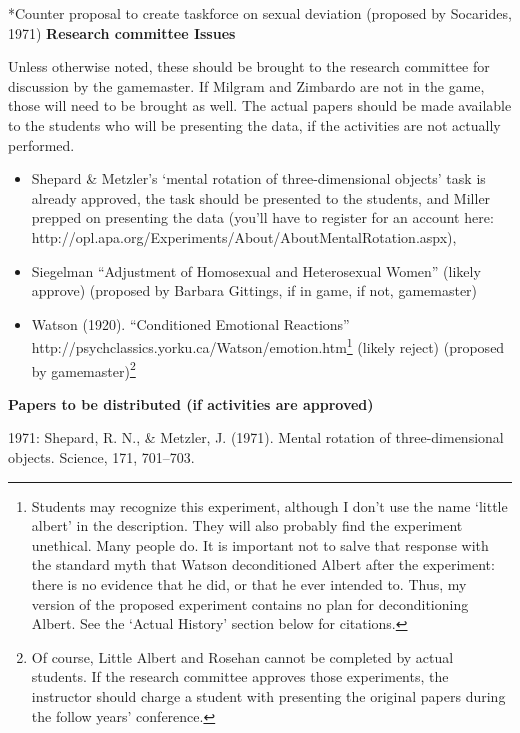 *Counter proposal to create taskforce on sexual deviation (proposed by Socarides, 1971)
 \textbf{Research committee Issues}

Unless otherwise noted, these should be brought to the research committee for discussion by the gamemaster. If Milgram and Zimbardo are not in the game, those will need to be brought as well. The actual papers should be made available to the students who will be presenting the data, if the activities are not actually performed.

\begin{itemize}
\item Shepard \& Metzler's `mental rotation of three-dimensional objects' task is already approved, the task should be presented to the students, and Miller prepped on presenting the data (you'll have to register for an account here: http:\slash \slash opl.apa.org\slash Experiments\slash About\slash AboutMentalRotation.aspx), 

\item Siegelman ``Adjustment of Homosexual and Heterosexual Women'' (likely approve) (proposed by Barbara Gittings, if in game, if not, gamemaster)

\item Watson (1920). ``Conditioned Emotional Reactions'' http:\slash \slash psychclassics.yorku.ca\slash Watson\slash emotion.htm\footnote{Students may recognize this experiment, although I don't use the name `little albert' in the description. They will also probably find the experiment unethical. Many people do. It is important not to salve that response with the standard myth that Watson deconditioned Albert after the experiment: there is no evidence that he did, or that he ever intended to. Thus, my version of the proposed experiment contains no plan for deconditioning Albert. See the `Actual History' section below for citations.} (likely reject) (proposed by gamemaster)\footnote{Of course, Little Albert and Rosehan cannot be completed by actual students. If the research committee approves those experiments, the instructor should charge a student with presenting the original papers during the follow years' conference.}

\end{itemize}

\textbf{Papers to be distributed (if activities are approved)}

1971: Shepard, R. N., \& Metzler, J. (1971). Mental rotation of three-dimensional objects. Science, 171, 701--703.

